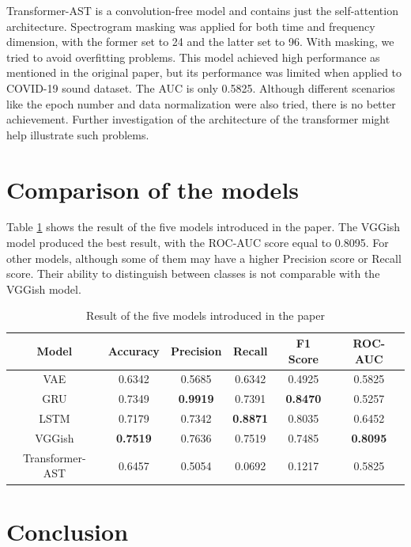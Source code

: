 \documentclass[11pt]{article}
\begin{document}
Transformer-AST is a convolution-free model and contains just the self-attention architecture. Spectrogram masking was applied for both time and frequency dimension, with the former set to 24 and the latter set to 96. With masking, we tried to avoid overfitting problems. This model achieved high performance as mentioned in the original paper, but its performance was limited when applied to COVID-19 sound dataset. The AUC is only 0.5825. Although different scenarios like the epoch number and data normalization were also tried, there is no better achievement. Further investigation of the architecture of the transformer might help illustrate such problems.

\section{Comparison of the models}

Table \ref{tab:cmp_model} shows the result of the five models introduced in the paper. The VGGish model produced the best result, with the ROC-AUC score equal to 0.8095. For other models, although some of them may have a higher Precision score or Recall score. Their ability to distinguish between classes is not comparable with the VGGish model.

\begin{table}
	\centering
	\begin{tabular}[!htbp]{|c|c|c|c|c|c|}
	\hline
	Model & Accuracy & Precision & Recall & F1 Score & ROC-AUC\\
	\hline
	VAE & 0.6342 & 0.5685 & 0.6342 & 0.4925 & 0.5825\\
	\hline
	GRU & 0.7349 & \textbf{0.9919} & 0.7391 & \textbf{0.8470} & 0.5257\\
	\hline
	LSTM & 0.7179 & 0.7342 & \textbf{0.8871} & 0.8035 & 0.6452\\
	\hline
	VGGish & \textbf{0.7519} & 0.7636 & 0.7519 & 0.7485 & \textbf{0.8095}\\
	\hline
	Transformer-AST & 0.6457 & 0.5054 & 0.0692 & 0.1217 & 0.5825\\
	\hline
	\end{tabular}
	\caption{Result of the five models introduced in the paper}
	\label{tab:cmp_model}
\end{table}

\section{Conclusion}
\end{document}
